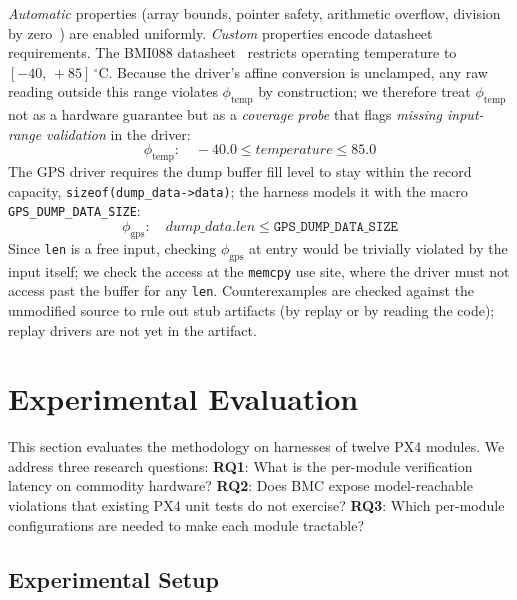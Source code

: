 \documentclass[conference]{IEEEtran}
\newcommand{\entra}[1]{#1}
\begin{document}
\emph{Automatic} properties (array bounds, pointer safety,
arithmetic overflow, division by zero~\cite{Menezes2024,Monteiro2022}) are enabled uniformly.
\emph{Custom} properties encode datasheet requirements.
The BMI088 datasheet~\cite{Bosch2022} restricts operating temperature
to $[-40,\,+85]\,^\circ$C. Because the driver's affine conversion is unclamped, any raw reading outside this range violates
$\phi_{\text{temp}}$ by construction; we therefore treat
$\phi_{\text{temp}}$ not as a hardware guarantee but as a
\emph{coverage probe} that flags \emph{missing input-range validation}
in the driver:
\begin{equation}
  \phi_{\text{temp}}: \quad -40.0 \leq \textit{temperature} \leq 85.0
  \label{eq:prop_temp}
\end{equation}
\entra{The GPS driver requires the dump buffer fill level to stay within
the record capacity, \texttt{sizeof(dump\_data->data)}; the harness models
it with the macro \texttt{GPS\_DUMP\_DATA\_SIZE}:}
\begin{equation}
  \phi_{\text{gps}}: \quad \textit{dump\_data.len} \leq \texttt{GPS\_DUMP\_DATA\_SIZE}
  \label{eq:prop_gps}
\end{equation}
Since \texttt{len} is a free input, checking $\phi_{\text{gps}}$ at
entry would be trivially violated by the input itself; we check the access at the \texttt{memcpy} use site,
where the driver must not access past the buffer for any \texttt{len}.
Counterexamples are checked against the unmodified source to rule out stub artifacts (by replay or by reading the code); replay drivers are not yet in the artifact.

\section{Experimental Evaluation}
\label{sec:results}

This section evaluates the methodology on harnesses of twelve
PX4 modules. We address three research questions: \textbf{RQ1}:
What is the per-module verification latency on commodity
hardware? \textbf{RQ2}: Does BMC expose model-reachable violations
that existing PX4 unit tests do not exercise? \textbf{RQ3}: Which
per-module configurations are needed to make each module
tractable?

\subsection{Experimental Setup}
\label{subsec:setup}
\end{document}
